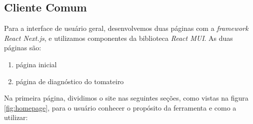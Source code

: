 \subsection{Cliente Comum}

Para a interface de usuário geral, desenvolvemos duas páginas com a \textit{framework} \emph{React Next.js}, e utilizamos componentes da biblioteca \emph{React MUI}. As duas páginas são:

\begin{enumerate}
    \item página inicial
    \item página de diagnóstico do tomateiro
\end{enumerate}

Na primeira página, dividimos o site nas seguintes seções, como vistas na figura \ref{fig:homepage}, para o usuário conhecer o propósito da ferramenta e como a utilizar:

